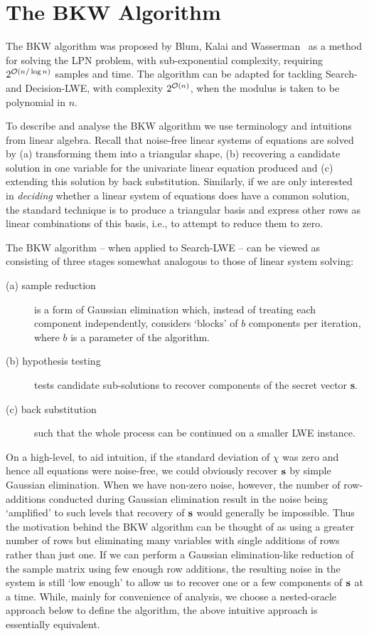\section{The BKW Algorithm}
\label{sec:bkw-algorithm}

The BKW algorithm was proposed by Blum, Kalai and Wasserman~\cite{DBLP:journals/jacm/BlumKW03} as a method for solving the LPN problem, with sub-exponential complexity, requiring $2^{\mathcal{O}\left(n / \log n\right)}$ samples and time. The algorithm can be adapted for tackling Search- and Decision-LWE, with complexity $2^{\mathcal{O}\left(n\right)}$, when the modulus is taken to be polynomial in $n$. 

To describe and analyse the BKW algorithm we use terminology and intuitions from linear algebra. Recall that noise-free linear systems of equations are solved by (a) transforming them into a triangular shape, (b) recovering a candidate solution in one variable for the univariate linear equation produced and (c) extending this solution by back substitution. Similarly, if we are only interested in \emph{deciding} whether a linear system of equations does have a common solution, the standard technique is to produce a triangular basis and express other rows as linear combinations of this basis, i.e., to attempt to reduce them to zero.

The BKW algorithm -- when applied to Search-LWE -- can be viewed as consisting of three stages somewhat analogous to those of linear system solving: 
\begin{description}
 \item[(a) sample reduction] is a form of Gaussian elimination which, instead of treating each component independently, considers `blocks' of $b$ components per iteration, where $b$ is a parameter of the algorithm.
 \item[(b) hypothesis testing] tests candidate sub-solutions to recover components of the secret vector {\bf s}.
 \item[(c) back substitution] such that the whole process can be continued on a smaller LWE instance.
\end{description}

On a high-level, to aid intuition, if the standard deviation of $\chi$ was zero and hence all equations were noise-free, we could obviously recover $\mathbf{s}$ by simple Gaussian elimination. When we have non-zero noise, however, the number of row-additions conducted during Gaussian elimination result in the noise being `amplified' to such levels that recovery of $\mathbf{s}$ would generally be impossible. Thus the motivation behind the BKW algorithm can be thought of as using a greater number of rows but eliminating many variables with single additions of rows rather than just one. If we can perform a Gaussian elimination-like reduction of the sample matrix using few enough row additions, the resulting noise in the system is still `low enough' to allow us to recover one or a few components of $\mathbf{s}$ at a time. While, mainly for convenience of analysis, we choose a nested-oracle approach below to define the algorithm, the above intuitive approach is essentially equivalent.

